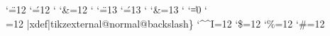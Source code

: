 \def\tikzexternal@ensure@nonempty@floats{%
    tikzexternal: picture has been externalized. This text is required to avoid empty floats.
}%

\def\tikzexternal@externalizefig@systemcall{%
    \tikzexternal@TEXDIALECT@collectpicture\tikzexternal@externalizefig@systemcall@@
}

{
\catcode`\"=12
\catcode`\'=12
\catcode`
\catcode`\&=12
\catcode`
\xdef\tikzexternal@normal@dq{"}
\xdef\tikzexternal@normal@sq{'}
\xdef\tikzexternal@normal@semic{;}
\xdef\tikzexternal@normal@and{&}
\xdef\tikzexternal@normal@dash{-}
\catcode`\"=13
\catcode`\'=13
\catcode`
\catcode`\&=13
\catcode`
\gdef\tikzexternal@activate@normal@dq{\let"=\tikzexternal@normal@dq}
\gdef\tikzexternal@activate@normal@sq{\let'=\tikzexternal@normal@sq}
\gdef\tikzexternal@activate@normal@semic{\let;=\tikzexternal@normal@semic}
\gdef\tikzexternal@activate@normal@and{\let&=\tikzexternal@normal@and}
\gdef\tikzexternal@activate@normal@dash{\let-=\tikzexternal@normal@dash}
\catcode`\|=0
\catcode`\\=12
|xdef|tikzexternal@normal@backslash{\}%
}
{
\catcode`\^^I=12
\catcode`\$=12
\catcode`\%=12
\catcode`\#=12
\gdef\tikzexternal@HASHchar{#}
\gdef\tikzexternal@TABchar{^^I}\gdef\tikzexternal@PERCENTchar{%

}}}
